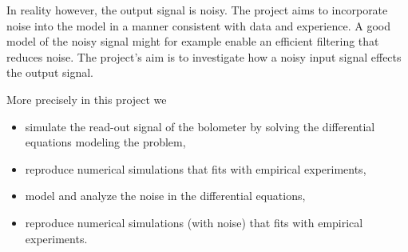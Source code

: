 In reality however, the output signal is noisy. The project aims to incorporate noise into the model in a manner consistent with data and experience. A good model of the noisy signal might for example enable an efficient filtering that reduces noise. The project's aim is to investigate how a noisy input signal effects the output signal.

More precisely in this project we
\begin{itemize}
 \item simulate the read-out signal of the bolometer by solving the differential equations modeling the problem,
 \item reproduce numerical simulations that fits with empirical experiments,
 \item model and analyze the noise in the differential equations,
 \item reproduce numerical simulations (with noise) that fits with empirical experiments.
\end{itemize}
